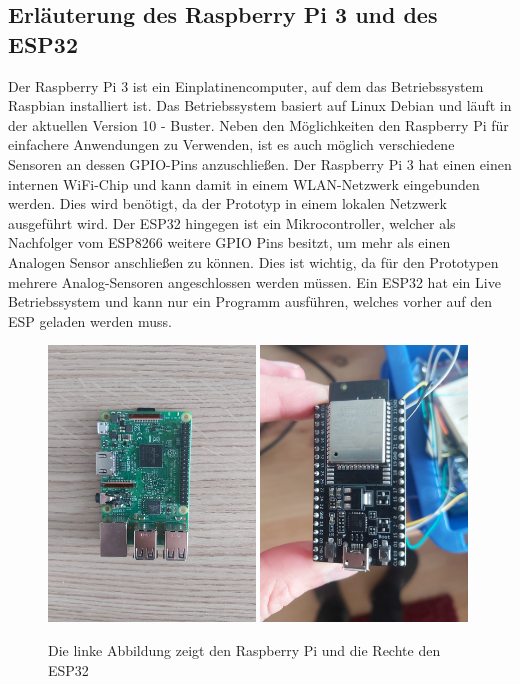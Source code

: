 \subsection{Erläuterung des Raspberry Pi 3 und des ESP32}
Der Raspberry Pi 3 ist ein Einplatinencomputer, auf dem das Betriebssystem Raspbian installiert ist. Das Betriebssystem basiert auf Linux Debian und läuft in der aktuellen Version 10 - Buster. Neben den Möglichkeiten den Raspberry Pi für einfachere Anwendungen zu Verwenden, ist es auch möglich verschiedene Sensoren an dessen GPIO-Pins anzuschließen. Der Raspberry Pi 3 hat einen einen internen WiFi-Chip und kann damit in einem WLAN-Netzwerk eingebunden werden. Dies wird benötigt, da der Prototyp in einem lokalen Netzwerk ausgeführt wird.
\newline
Der ESP32 hingegen ist ein Mikrocontroller, welcher als Nachfolger vom ESP8266 weitere GPIO Pins besitzt, um mehr als einen Analogen Sensor anschließen zu können. Dies ist wichtig, da für den Prototypen mehrere Analog-Sensoren angeschlossen werden müssen. Ein ESP32 hat ein Live Betriebssystem und kann nur ein Programm ausführen, welches vorher auf den ESP geladen werden muss. 

\begin{figure}[H]
	\centering
		\includegraphics[width=0.49\textwidth]{images/r_pi.jpg}
		\includegraphics[width=0.49\textwidth]{images/esp_32.jpg}
	\caption{Die linke Abbildung zeigt den Raspberry Pi und die Rechte den ESP32}
	\label{fig:hardware}
\end{figure}

